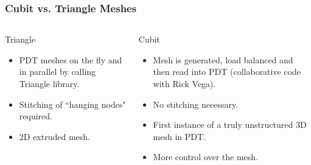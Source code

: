 \documentclass[xcolor={usenames,dvipsnames,svgnames,table}]{beamer}
\begin{document}
\begin{frame}[t]\frametitle{Cubit vs. Triangle Meshes}
\begin{columns}

\begin{column}{.49\textwidth}
\begin{block}{Triangle}
  \begin{itemize}
    \item PDT meshes on the fly and in parallel by calling Triangle library.
    \item Stitching of ``hanging nodes" required.
    \item 2D extruded mesh.
  \end{itemize}
\end{block}
\end{column}

\begin{column}{.49\textwidth}
\begin{block}{Cubit}
  \begin{itemize}
    \item Mesh is generated, load balanced and then read into PDT (collaborative code with Rick Vega).
    \item No stitching necessary.
    \item First instance of a truly unstructured 3D mesh in PDT.
    \item More control over the mesh.
  \end{itemize}
\end{block}
\end{column}
\end{columns}
\end{frame}
\end{document}
